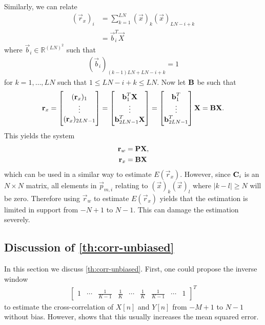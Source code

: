 \documentclass[a4paper, openany, oneside]{memoir}
\begin{document}
Similarly, we can relate
\begin{align*}
    (\vec{r}_x)_i &= \sum_{k=1}^{LN}(\vec{x})_k (\vec{x})_{LN-i+k} \\
    &= \vec{b}_i^T \vec{X}
\end{align*}
where $\vec{b}_i \in \mathbb{R}^{(LN)^2}$ such that
\begin{align*}
    (\vec{b}_i)_{(k-1)LN+LN-i+k} = 1
\end{align*}
for $k = 1,\ldots,LN$ such that $1 \le LN-i+k \le LN$. Now let $\boldsymbol{\mathbf{B}}$ be such that
\begin{align*}
    \boldsymbol{\mathbf{r}}_x = \begin{bmatrix}
        (\boldsymbol{\mathbf{r}}_x)_1 \\
        \vdots \\
        (\boldsymbol{\mathbf{r}}_x)_{2LN-1}
    \end{bmatrix} = \begin{bmatrix}
        \boldsymbol{\mathbf{b}}_1^T \boldsymbol{\mathbf{X}} \\
        \vdots \\
        \boldsymbol{\mathbf{b}}_{2LN-1}^T \boldsymbol{\mathbf{X}}
    \end{bmatrix} = \begin{bmatrix}
        \boldsymbol{\mathbf{b}}_1^T \\
        \vdots \\
        \boldsymbol{\mathbf{b}}_{2LN-1}^T
    \end{bmatrix} \boldsymbol{\mathbf{X}} = \boldsymbol{\mathbf{B}} \boldsymbol{\mathbf{X}}.
\end{align*}
This yields the system
\begin{align*}
    \boldsymbol{\mathbf{r}}_w &= \boldsymbol{\mathbf{P}} \boldsymbol{\mathbf{X}}, \\
    \boldsymbol{\mathbf{r}}_x &= \boldsymbol{\mathbf{B}} \boldsymbol{\mathbf{X}}
\end{align*}
which can be used in a similar way to estimate $E(\vec{r}_x)$. However, since $\boldsymbol{\mathbf{C}}_i$ is an $N \times N$ matrix, all elements in $\vec{p}_{m,i}$ relating to $(\vec{x})_k (\vec{x})_l$ where $|k - l| \ge N$ will be zero. Therefore using $\vec{r}_w$ to estimate $E(\vec{r}_x)$ yields that the estimation is limited in support from $-N+1$ to $N-1$. This can damage the estimation severely.

\subsection{Discussion of \cref{th:corr-unbiased}}
In this section we discuss \cref{th:corr-unbiased}. First, one could propose the inverse window
\begin{align*}
    \begin{bmatrix}
        1 & \cdots & \frac{1}{K-1} & \frac{1}{K} & \cdots & \frac{1}{K} & \frac{1}{K-1} & \cdots & 1
    \end{bmatrix}^T
\end{align*}
to estimate the cross-correlation of $X[n]$ and $Y[n]$ from $-M+1$ to $N-1$ without bias. However, \cite{percival1993univariate} shows that this usually increases the mean squared error.
\end{document}
